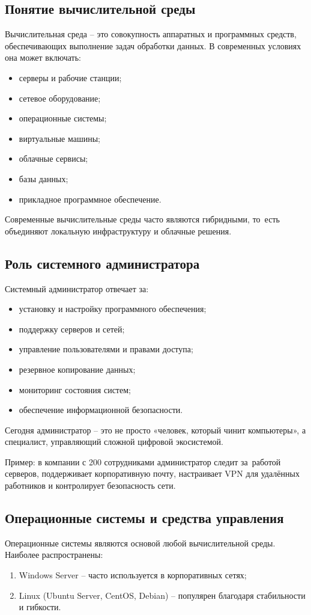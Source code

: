 \documentclass{ou}
\begin{document}
\subsection{Понятие вычислительной среды}
	Вычислительная среда -- это совокупность аппаратных и программных средств, обеспечивающих выполнение задач обработки данных. В современных условиях она может включать:
    \begin{itemize}[label=-, leftmargin=0em, itemindent=3.35em, nosep]
\item серверы и рабочие станции;
\item сетевое оборудование;
\item операционные системы;
\item виртуальные машины;
\item облачные сервисы;
\item базы данных;
\item прикладное программное обеспечение.
\end{itemize}

Современные вычислительные среды часто являются гибридными, то~есть объединяют локальную инфраструктуру и облачные решения.
\subsection{Роль системного администратора}
	Системный администратор отвечает за:
        \begin{itemize}[label=-, leftmargin=0em, itemindent=3.35em, nosep]
\item установку и настройку программного обеспечения;
\item поддержку серверов и сетей;
\item управление пользователями и правами доступа;
\item резервное копирование данных;
\item мониторинг состояния систем;
\item обеспечение информационной безопасности.
\end{itemize}

	Сегодня администратор -- это не просто «человек, который чинит компьютеры», а специалист, управляющий сложной цифровой экосистемой.
    
	Пример: в компании с 200 сотрудниками администратор следит за~работой серверов, поддерживает корпоративную почту, настраивает VPN для удалённых работников и контролирует безопасность сети.
\subsection{Операционные системы и средства управления}
Операционные системы являются основой любой вычислительной среды. Наиболее распространены:
\begin{enumerate}[leftmargin=0em, itemindent=3.75em, nosep, label=\arabic*)]
\item Windows Server -- часто используется в корпоративных сетях;
\item Linux (Ubuntu Server, CentOS, Debian) -- популярен благодаря стабильности и гибкости.
\end{enumerate}
\end{document}
